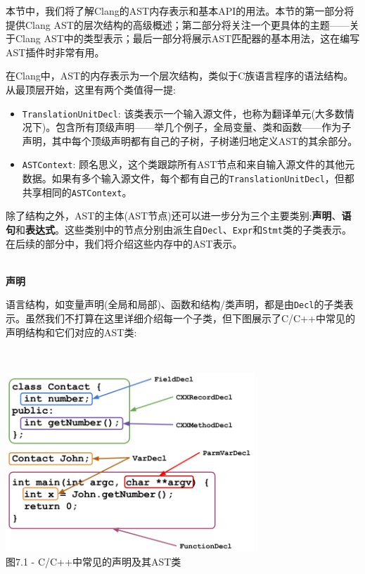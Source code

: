 
本节中，我们将了解Clang的AST内存表示和基本API的用法。本节的第一部分将提供Clang AST的层次结构的高级概述；第二部分将关注一个更具体的主题——关于Clang AST中的类型表示；最后一部分将展示AST匹配器的基本用法，这在编写AST插件时非常有用。


在Clang中，AST的内存表示为一个层次结构，类似于C族语言程序的语法结构。从最顶层开始，这里有两个类值得一提:

\begin{itemize}
\item \texttt{TranslationUnitDecl}: 该类表示一个输入源文件，也称为翻译单元(大多数情况下)。包含所有顶级声明——举几个例子，全局变量、类和函数——作为子声明，其中每个顶级声明都有自己的子树，子树递归地定义AST的其余部分。

\item \texttt{ASTContext}: 顾名思义，这个类跟踪所有AST节点和来自输入源文件的其他元数据。如果有多个输入源文件，每个都有自己的\texttt{TranslationUnitDecl}，但都共享相同的\texttt{ASTContext}。
\end{itemize}

除了结构之外，AST的主体(AST节点)还可以进一步分为三个主要类别:\textbf{声明}、\textbf{语句}和\textbf{表达式}。这些类别中的节点分别由派生自\texttt{Decl}、\texttt{Expr}和\texttt{Stmt}类的子类表示。在后续的部分中，我们将介绍这些内存中的AST表示。

\hspace*{\fill} \\ %
\noindent
\textbf{声明}

语言结构，如变量声明(全局和局部)、函数和结构/类声明，都是由\texttt{Decl}的子类表示。虽然我们不打算在这里详细介绍每一个子类，但下图展示了C/C++中常见的声明结构和它们对应的AST类:

\hspace*{\fill} \\ %
\begin{center}
\includegraphics[width=0.7\textwidth]{content/2/chapter7/images/1.png}\\
图7.1 - C/C++中常见的声明及其AST类
\end{center}

